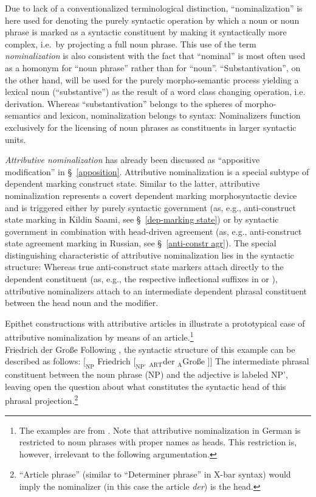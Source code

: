 Due to lack of a conventionalized terminological distinction, “nominalization” is here used for denoting the purely syntactic operation by which a noun or noun phrase is marked as a syntactic constituent by making it syntactically more complex, i.e.~by projecting a full noun phrase. This use of the term \emph{nominalization} is also consistent with the fact that “nominal” is most often used as a homonym for “noun phrase” rather than for “noun”. “Substantivation”, on the other hand, will be used for the purely morpho-semantic process yielding a lexical noun (“substantive”) as the result of a word class changing operation, i.e. derivation. Whereas “substantivation” belongs to the spheres of morpho-semantics and lexicon, nominalization belongs to syntax: Nominalizers function exclusively for the licensing of noun phrases as constituents in larger syntactic units.

\emph{Attributive nominalization} has already been discussed as “appositive modification” in \S~\ref{apposition}. Attributive nominalization is a special subtype of dependent marking construct state. Similar to the latter, attributive nominalization represents a covert dependent marking morphosyntactic device and is triggered either by purely syntactic government (as, e.g., anti\hyp{}construct state marking in Kildin Saami, see \S~\ref{dep-marking state}) or by syntactic government in combination with head\hyp{}driven agreement (as, e.g., anti\hyp{}construct state agreement marking in Russian, see \S~\ref{anti-constr agr}). The special distinguishing characteristic of attributive nominalization lies in the syntactic structure: Whereas true anti\hyp{}construct state markers attach directly to the dependent constituent (as, e.g., the respective inflectional suffixes in  or ), attributive nominalizers attach to an intermediate dependent phrasal constituent between the head noun and the modifier.

Epithet constructions with attributive articles in  illustrate a prototypical case of attributive nominalization by means of an article.\footnote{The examples are from \citet[179–180]{himmelmann1997}. Note that attributive nominalization in German is restricted to noun phrases with proper names as heads. This restriction is, however, irrelevant to the following argumentation.}
\ea \label{german epithet}
\\
Friedrich der Große 			
\z
Following \citet[180]{himmelmann1997}, the syntactic structure of this example can be described as follows:
\ea	$[_\textrm{NP}$ Friedrich $[_\textrm{NP'}$ $_\textrm{ART}$der $_\textrm{A}$Große $] ]$
\z
The intermediate phrasal constituent between the noun phrase (NP) and the adjective is labeled NP', leaving open the question about what constitutes the syntactic head of this phrasal projection.\footnote{“Article phrase” (similar to “Determiner phrase” in X-bar syntax) would imply the nominalizer (in this case the article \textit{der}) is the head.}

